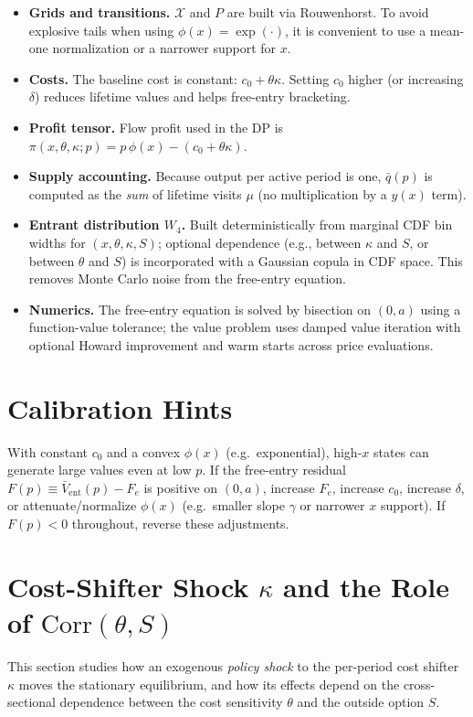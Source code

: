 \documentclass[11pt]{article}
\begin{document}
\begin{itemize}
\item \textbf{Grids and transitions.} $\mathcal{X}$ and $P$ are built via Rouwenhorst. To avoid explosive tails when using $\phi(x)=\exp(\cdot)$, it is convenient to use a mean-one normalization or a narrower support for $x$.
\item \textbf{Costs.} The baseline cost is constant: $c_0+\theta\kappa$. Setting $c_0$ higher (or increasing $\delta$) reduces lifetime values and helps free-entry bracketing.
\item \textbf{Profit tensor.} Flow profit used in the DP is $\pi(x,\theta,\kappa;p)=p\,\phi(x)-(c_0+\theta\kappa)$.
\item \textbf{Supply accounting.} Because output per active period is one, $\bar q(p)$ is computed as the \emph{sum} of lifetime visits $\mu$ (no multiplication by a $y(x)$ term).
\item \textbf{Entrant distribution $W_4$.} Built deterministically from marginal CDF bin widths for $(x,\theta,\kappa,S)$; optional dependence (e.g., between $\kappa$ and $S$, or between $\theta$ and $S$) is incorporated with a Gaussian copula in CDF space. This removes Monte Carlo noise from the free-entry equation.
\item \textbf{Numerics.} The free-entry equation is solved by bisection on $(0,a)$ using a function-value tolerance; the value problem uses damped value iteration with optional Howard improvement and warm starts across price evaluations.
\end{itemize}

\section{Calibration Hints}

With constant $c_0$ and a convex $\phi(x)$ (e.g.\ exponential), high-$x$ states can generate large values even at low $p$. If the free-entry residual $F(p)\equiv\bar V_{\text{ent}}(p)-F_e$ is positive on $(0,a)$, increase $F_e$, increase $c_0$, increase $\delta$, or attenuate/normalize $\phi(x)$ (e.g.\ smaller slope $\gamma$ or narrower $x$ support). If $F(p)<0$ throughout, reverse these adjustments.
\section{Cost-Shifter Shock $\kappa$ and the Role of $\mathrm{Corr}(\theta,S)$}
\label{sec:kshock-thetaS}

This section studies how an exogenous \emph{policy shock} to the per-period cost shifter $\kappa$ moves the stationary equilibrium, and how its effects depend on the cross-sectional dependence between the cost sensitivity $\theta$ and the outside option $S$.
\end{document}
